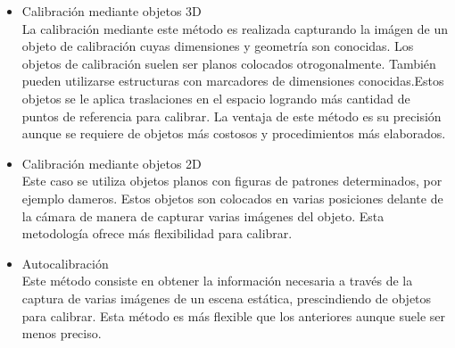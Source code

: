 \begin{itemize}
\item Calibración mediante objetos 3D\\

La calibración mediante este método es realizada capturando la imágen de un objeto de calibración cuyas dimensiones y geometría son conocidas. Los objetos de calibración suelen ser planos colocados otrogonalmente. También pueden utilizarse estructuras con marcadores de dimensiones conocidas.Estos objetos se le aplica traslaciones en el espacio logrando más cantidad de puntos de referencia para calibrar. La ventaja de este método es su precisión aunque se requiere de objetos más costosos y procedimientos más elaborados.\\

\item Calibración mediante objetos 2D\\

Este caso se utiliza objetos planos con figuras de patrones determinados, por ejemplo dameros. Estos objetos son colocados en varias posiciones delante de la cámara de manera de capturar varias imágenes del objeto. Esta metodología ofrece más flexibilidad para calibrar.\\

\item Autocalibración\\

Este método consiste en obtener la información necesaria a través de la captura de varias imágenes de un escena estática, prescindiendo de objetos para calibrar. Esta método es más flexible que  los anteriores aunque suele ser menos preciso.

\end{itemize}










